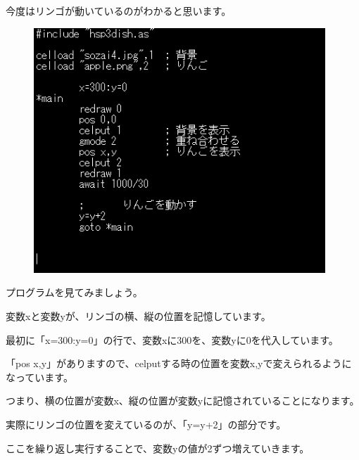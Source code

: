 今度はリンゴが動いているのがわかると思います。


\begin{figure}[H]
    \begin{center}
      \includegraphics[keepaspectratio,width=10.954cm,height=9.213cm]{text04-img/text04-img020.png}
    \end{center}
    \label{fig:prog_menu}
\end{figure}


プログラムを見てみましょう。

変数xと変数yが、リンゴの横、縦の位置を記憶しています。

最初に「x=300:y=0」の行で、変数xに300を、変数yに0を代入しています。



\begin{description}
    \item {}
    \item {}
    \item {}
\end{description}

「pos x,y」がありますので、celputする時の位置を変数x,yで変えられるようになっています。

つまり、横の位置が変数x、縦の位置が変数yに記憶されていることになります。

実際にリンゴの位置を変えているのが、「y=y+2」の部分です。

ここを繰り返し実行することで、変数yの値が2ずつ増えていきます。



